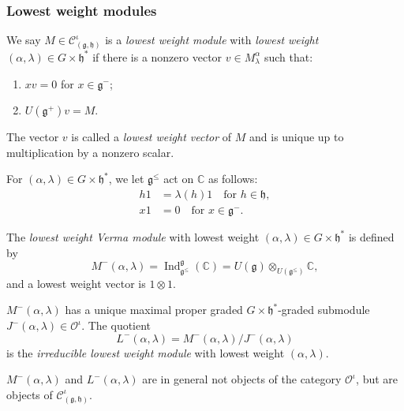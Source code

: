 \documentclass{beamer}
\DeclareMathOperator{\Ind}{Ind}
\begin{document}
\begin{frame}
  \frametitle{Lowest weight modules}
  We say $M \in \mathcal{C}^{\iota}_{(\mathfrak{g}, \mathfrak{h})}$ is a \emph{lowest weight module} with \emph{lowest weight} $(\alpha, \lambda) \in G \times \mathfrak{h}^*$ if there is a nonzero vector $v \in M^{\alpha}_{\lambda}$ such that:
  \begin{enumerate}
  \item $xv = 0$ for $x \in \mathfrak{g}^-$;
  \item $U(\mathfrak{g}^+)v = M$.
  \end{enumerate}
  The vector $v$ is called a \emph{lowest weight vector} of $M$ and is unique up to multiplication by a nonzero scalar.

  For $(\alpha, \lambda) \in G \times \mathfrak{h}^*$, we let $\mathfrak{g}^{\le}$ act on $\mathbb{C}$ as follows:
  \begin{align*}
    h1 &= \lambda(h)1 \quad \text{for $h \in \mathfrak{h}$}, \\
    x1 &= 0 \quad \text{for $x \in \mathfrak{g}^-$}.
  \end{align*}

  The \emph{lowest weight Verma module} with lowest weight $(\alpha, \lambda) \in G \times \mathfrak{h}^*$ is defined by
  \begin{equation*}
    M^-(\alpha, \lambda) = \Ind^{\mathfrak{g}}_{\mathfrak{g}^{\le}}(\mathbb{C}) = U(\mathfrak{g}) \otimes_{U(\mathfrak{g}^{\le})} \mathbb{C},
  \end{equation*}
  and a lowest weight vector is $1\otimes1$.
\end{frame}

\begin{frame}
  $M^-(\alpha, \lambda)$ has a unique maximal proper graded $G \times \mathfrak{h}^*$-graded submodule $J^-(\alpha, \lambda) \in \mathcal{O}^{\iota}$.
  The quotient
  \begin{equation*}
    L^-(\alpha, \lambda) = M^-(\alpha, \lambda)/J^-(\alpha, \lambda)
  \end{equation*}
  is the \emph{irreducible lowest weight module} with lowest weight $(\alpha, \lambda)$.

  $M^-(\alpha, \lambda)$ and $L^-(\alpha, \lambda)$ are in general not objects of the category $\mathcal{O}^{\iota}$, but are objects of $\mathcal{C}^{\iota}_{(\mathfrak{g}, \mathfrak{h})}$.
\end{frame}
\end{document}

